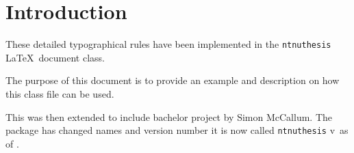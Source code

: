 \chapter{Introduction}
\label{chap:introduction}

 These detailed
typographical rules have been implemented in the
\texttt{ntnuthesis} \LaTeX\ document class.

The purpose of this document is to provide an example and description
on how this class file can be used.

This was then extended to include bachelor project by Simon McCallum.
The package has changed names and version number it is now called
\texttt{ntnuthesis}
v\ntnuthesisversion\ as of \ntnuthesisdate.